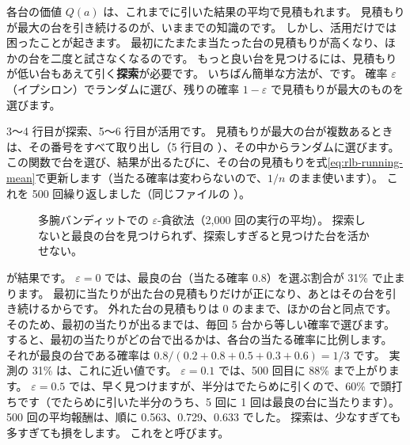 各台の価値 $Q(a)$ は、これまでに引いた結果の平均で見積もれます。
見積もりが最大の台を引き続けるのが、いままでの知識のです。
しかし、活用だけでは困ったことが起きます。
最初にたまたま当たった台の見積もりが高くなり、ほかの台を二度と試さなくなるのです。
もっと良い台を見つけるには、見積もりが低い台もあえて引く\textbf{探索}が必要です。
いちばん簡単な方法が、です。
確率 $\varepsilon$（イプシロン）でランダムに選び、残りの確率 $1-\varepsilon$ で見積もりが最大のものを選びます。


3〜4 行目が探索、5〜6 行目が活用です。
見積もりが最大の台が複数あるときは、その番号をすべて取り出し（5 行目の ）、その中からランダムに選びます。
この関数で台を選び、結果が出るたびに、その台の見積もりを式\eqref{eq:rlb-running-mean}で更新します（当たる確率は変わらないので、$1/n$ のまま使います）。
これを 500 回繰り返しました（同じファイルの ）。

\begin{figure}[tbp]
\centering
{}
\caption{多腕バンディットでの $\varepsilon$-貪欲法（2,000 回の実行の平均）。
探索しないと最良の台を見つけられず、探索しすぎると見つけた台を活かせない。}
\label{fig:rlb-bandit}
\end{figure}

が結果です。
$\varepsilon=0$ では、最良の台（当たる確率 0.8）を選ぶ割合が 31\% で止まります。
最初に当たりが出た台の見積もりだけが正になり、あとはその台を引き続けるからです。
外れた台の見積もりは 0 のままで、ほかの台と同点です。
そのため、最初の当たりが出るまでは、毎回 5 台から等しい確率で選びます。
すると、最初の当たりがどの台で出るかは、各台の当たる確率に比例します。
それが最良の台である確率は $0.8/(0.2+0.8+0.5+0.3+0.6)=1/3$ です。
実測の 31\% は、これに近い値です。
$\varepsilon=0.1$ では、500 回目に 88\% まで上がります。
$\varepsilon=0.5$ では、早く見つけますが、半分はでたらめに引くので、60\% で頭打ちです（でたらめに引いた半分のうち、5 回に 1 回は最良の台に当たります）。
500 回の平均報酬は、順に 0.563、0.729、0.633 でした。
探索は、少なすぎても多すぎても損をします。
これをと呼びます。

